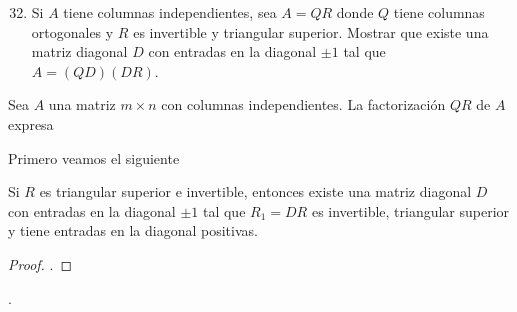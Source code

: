 \begin{frame}
	\begin{enumerate}\setcounter{enumi}{31}
		\item

		      Si $A$ tiene columnas independientes, sea $A=QR$ donde $Q$
		      tiene columnas ortogonales y $R$ es invertible y triangular
		      superior.
		      Mostrar que existe una matriz diagonal $D$ con entradas en
		      la diagonal $\pm 1$ tal que
		      \begin{math}
			      A=
			      \left(QD\right)
			      \left(DR\right)
		      \end{math}.
	\end{enumerate}

	\begin{solution}

		\begin{theorem}[Factorización $QR$]
			Sea $A$ una matriz $m\times n$ con columnas independientes.
			La \alert{factorización $QR$} de $A$ expresa
		\end{theorem}

		Primero veamos el siguiente
		\begin{theorem}
			Si $R$ es triangular superior e invertible, entonces existe
			una matriz diagonal $D$ con entradas en la diagonal $\pm 1$ tal
			que $R_{1}=DR$ es invertible, triangular superior y tiene
			entradas en la diagonal positivas.
		\end{theorem}

		\begin{proof}
			.
		\end{proof}
	\end{solution}
\end{frame}

\begin{frame}
	\begin{solution}

		.
	\end{solution}
\end{frame}